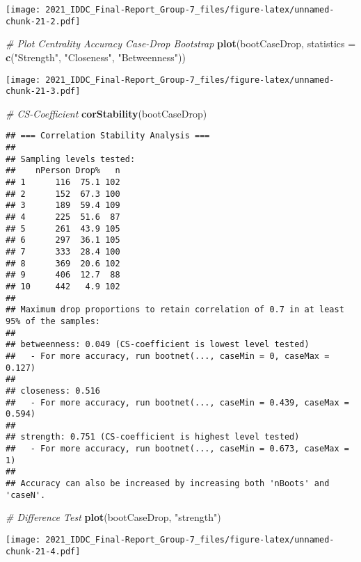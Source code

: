 \documentclass[
]{article}
\newenvironment{Shaded}{\begin{snugshade}}{\end{snugshade}}
\newcommand{\CommentTok}[1]{\textcolor[rgb]{0.56,0.35,0.01}{\textit{#1}}}
\newcommand{\DataTypeTok}[1]{\textcolor[rgb]{0.13,0.29,0.53}{#1}}
\newcommand{\KeywordTok}[1]{\textcolor[rgb]{0.13,0.29,0.53}{\textbf{#1}}}
\newcommand{\NormalTok}[1]{#1}
\newcommand{\StringTok}[1]{\textcolor[rgb]{0.31,0.60,0.02}{#1}}
\begin{document}
\texttt{[image: 2021\_IDDC\_Final-Report\_Group-7\_files/figure-latex/unnamed-chunk-21-2.pdf]}

\begin{Shaded}
\begin{Highlighting}[]
\CommentTok{# Plot Centrality Accuracy Case-Drop Bootstrap}
\KeywordTok{plot}\NormalTok{(bootCaseDrop,}
     \DataTypeTok{statistics =} \KeywordTok{c}\NormalTok{(}\StringTok{"Strength"}\NormalTok{, }\StringTok{"Closeness"}\NormalTok{, }\StringTok{"Betweenness"}\NormalTok{))}
\end{Highlighting}
\end{Shaded}

\texttt{[image: 2021\_IDDC\_Final-Report\_Group-7\_files/figure-latex/unnamed-chunk-21-3.pdf]}

\begin{Shaded}
\begin{Highlighting}[]
\CommentTok{# CS-Coefficient}
\KeywordTok{corStability}\NormalTok{(bootCaseDrop)}
\end{Highlighting}
\end{Shaded}

\begin{verbatim}
## === Correlation Stability Analysis === 
## 
## Sampling levels tested:
##    nPerson Drop%   n
## 1      116  75.1 102
## 2      152  67.3 100
## 3      189  59.4 109
## 4      225  51.6  87
## 5      261  43.9 105
## 6      297  36.1 105
## 7      333  28.4 100
## 8      369  20.6 102
## 9      406  12.7  88
## 10     442   4.9 102
## 
## Maximum drop proportions to retain correlation of 0.7 in at least 95% of the samples:
## 
## betweenness: 0.049 (CS-coefficient is lowest level tested)
##   - For more accuracy, run bootnet(..., caseMin = 0, caseMax = 0.127) 
## 
## closeness: 0.516 
##   - For more accuracy, run bootnet(..., caseMin = 0.439, caseMax = 0.594) 
## 
## strength: 0.751 (CS-coefficient is highest level tested)
##   - For more accuracy, run bootnet(..., caseMin = 0.673, caseMax = 1) 
## 
## Accuracy can also be increased by increasing both 'nBoots' and 'caseN'.
\end{verbatim}

\begin{Shaded}
\begin{Highlighting}[]
\CommentTok{# Difference Test}
\KeywordTok{plot}\NormalTok{(bootCaseDrop, }\StringTok{"strength"}\NormalTok{)}
\end{Highlighting}
\end{Shaded}

\texttt{[image: 2021\_IDDC\_Final-Report\_Group-7\_files/figure-latex/unnamed-chunk-21-4.pdf]}
\end{document}
